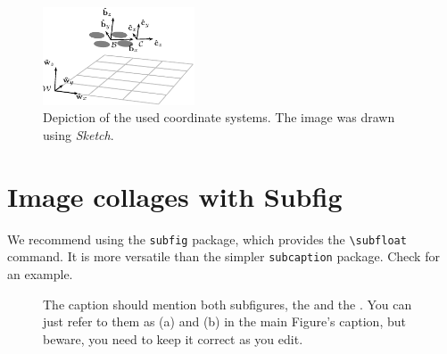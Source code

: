 \begin{figure}[htbp]
  \centering
  \includegraphics[width=0.4\textwidth]{./fig/sketch/coordinate_frames.pdf}
  \caption{Depiction of the used coordinate systems. The image was drawn using \emph{Sketch}.}
  \label{fig:coordinate_systems}
\end{figure}

\section{Image collages with Subfig}

We recommend using the \texttt{subfig} package, which provides the \texttt{\textbackslash{}subfloat} command.
It is more versatile than the simpler \texttt{subcaption} package.
Check  for an example.

\begin{figure}[htbp]
  \centering
  \caption{
The caption should mention both subfigures, the  and the .
You can just refer to them as (a) and (b) in the main Figure's caption, but beware, you need to keep it correct as you edit.
}
  \label{fig:uavs}
\end{figure}

